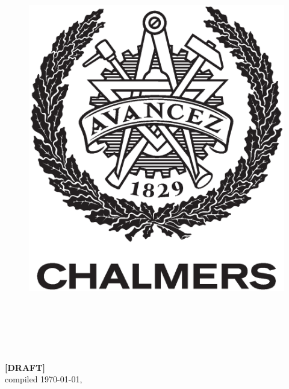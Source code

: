 \begin{center}
\begin{figure}[H]
        \includegraphics[width=0.2\pdfpagewidth]{template/figures/AvancezChalmers_black_centered.eps} \\
        \fi
        \end{figure}
        \vspace{5mm}

        \thesisDepartment\\
        \emph{\thesisDivision}\\
        \ifx\thesisGroup\undefined
        \else
            \thesisGroup\\
        \fi
        \textsc{\thesisUniversity}\\
        \thesisLocation\ \thesisYear\\
    \else
        \vspace{5cm}
		\textbf{\Huge [DRAFT]}\\[1cm]
		compiled \today, \currenttime
    \fi
\end{center}
\endgroup
